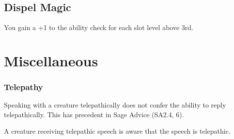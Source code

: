 \documentclass[House_Rules.tex]{subfiles}
\begin{document}
\subsection{Dispel Magic}
You gain a +1 to the ability check for each slot level above 3rd.




\section{Miscellaneous}

\subsubsection{Telepathy}
Speaking with a creature telepathically does not confer the ability to reply telepathically. This has precedent in Sage Advice (SA2.4, 6).

A creature receiving telepathic speech is aware that the speech is telepathic.
\end{document}

